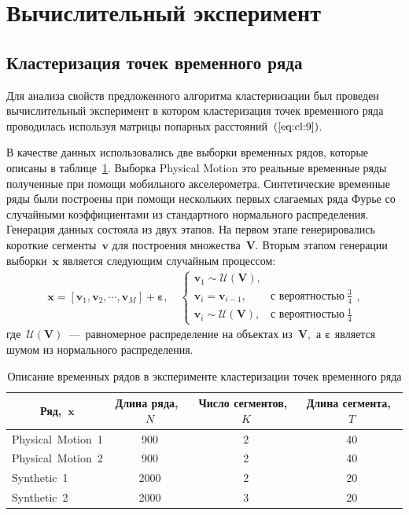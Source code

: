 \newpage

\section{Вычислительный эксперимент}
\subsection{Кластеризация точек временного ряда}
Для анализа свойств предложенного алгоритма кластериизации был проведен вычислительный эксперимент в котором кластеризация точек временного ряда проводилась используя матрицы попарных расстояний~$(\ref{eq:cl:9})$.

В качестве данных использовались две выборки временных рядов, которые описаны в таблице~\ref{table_1}. 
Выборка Physical Motion это реальные временные ряды полученные при помощи мобильного акселерометра. 
Синтетические временные ряды были построены при помощи нескольких первых слагаемых ряда Фурье со случайными коэффициентами из стандартного нормального распределения. 
Генерация данных состояла из двух этапов. 
На первом этапе генерировались короткие сегменты~$\textbf{v}$ для построения множества~$\mathbf{V}$. 
Вторым этапом генерации выборки~$\textbf{x}$ является следующим случайным процессом:
\begin{equation}
\label{eq:exp:1}
\begin{aligned}
\textbf{x} = [\textbf{v}_{1}, \textbf{v}_{2}, \cdots, \textbf{v}_{M}] + \bm{\varepsilon}, \quad \begin{cases}
    \textbf{v}_{1} \sim \mathcal{U}\left(\mathbf{V}\right),\\
    \textbf{v}_{i} = \textbf{v}_{i - 1}, & \text{с вероятностью}~\frac{3}{4}\\
    \textbf{v}_{i} \sim \mathcal{U}\left(\mathbf{V}\right), & \text{с вероятностью}~\frac{1}{4}
\end{cases},
\end{aligned}
\end{equation}
где~$\mathcal{U}\left(\mathbf{V}\right)$~---~равномерное распределение на объектах из~$\mathbf{V},$ а $\bm{\varepsilon}$ является шумом из нормального распределения.

\begin{table}[h!t]
\begin{center}
\caption{Описание временных рядов в эксперименте кластеризации точек временного ряда}
\label{table_1}
\begin{tabular}{|c|c|c|c|}
\hline
	Ряд,~$\textbf{x}$ &Длина ряда,~$N$& Число сегментов,~$K$&Длина сегмента,~$T$\\
	\hline
	\multicolumn{1}{|l|}{Physical~Motion~1}
	& 900& 2& 40\\
	\hline
	\multicolumn{1}{|l|}{Physical~Motion~2}
	& 900& 2& 40\\
	\hline
	\multicolumn{1}{|l|}{Synthetic~1}
	& 2000& 2& 20\\
	\hline
	\multicolumn{1}{|l|}{Synthetic~2}
	& 2000& 3& 20\\
\hline

\end{tabular}
\end{center}
\end{table}


